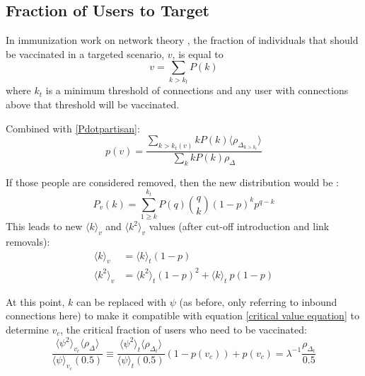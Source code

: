 \documentclass[NETN,manuscript]{stjour-new}
\begin{document}
\subsection{Fraction of Users to Target}
In immunization work on network theory \citep{pastor2002immunization}, the fraction of individuals that should be vaccinated in a targeted scenario, $v$, is equal to 
\begin{equation}
    v = \sum_{k > k_t}P(k)
\end{equation}
where $k_t$ is a minimum threshold of connections and any user with connections above that threshold will be vaccinated. 

Combined with \ref{Pdotpartisan}:
\begin{equation}
\label{probability of vaccinated}
p(v) = \frac{\sum_{k>k_t(v)}kP(k)\langle \rho_{\Delta_{k>k_t}}\rangle}{\sum_{k}kP(k)\rho_{\Delta}}
\end{equation}

If those people are considered removed, then the new distribution would be \citep{cohen2001breakdown}:
\begin{equation}
    P_v(k) = \sum_{1\geq k}^{k_t}P(q)\binom{q}{k}(1-p)^kp^{q-k}
\end{equation}
This leads to new $\langle k \rangle_v$ and $\langle k^2 \rangle_v$ values (after cut-off introduction and link removals)\citep{pastor2002immunization}: 
\begin{align*}
        \langle k \rangle_v &= \langle k \rangle_t(1-p)\\
         \langle k^2 \rangle_v &= \langle k^2 \rangle_t(1-p)^2+\langle k \rangle_t\ p(1-p)
\end{align*}

At this point, $k$ can be replaced with $\psi$ (as before, only referring to inbound connections here) to make it compatible with equation \ref{critical value equation} to determine $v_c$, the critical fraction of users who need to be vaccinated:
\begin{equation}
\label{v_c equation}
 \frac{\langle \psi^2 \rangle_{v_c}\langle\rho_{\Delta}\rangle}{\langle \psi \rangle_{v_c}(0.5)} \equiv \frac{\langle \psi^2 \rangle_{t}\langle\rho_{\Delta_t}\rangle}{\langle \psi \rangle_{t}(0.5)}(1-p(v_c))+p(v_c)=\lambda^{-1}\frac{\rho_{\Delta_t}}{0.5}
\end{equation}
\end{document}
